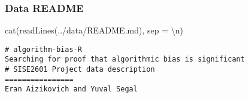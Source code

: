 \documentclass[
]{article}
\newenvironment{Shaded}{\begin{snugshade}}{\end{snugshade}}
\newcommand{\AttributeTok}[1]{\textcolor[rgb]{0.77,0.63,0.00}{#1}}
\newcommand{\FunctionTok}[1]{\textcolor[rgb]{0.00,0.00,0.00}{#1}}
\newcommand{\NormalTok}[1]{#1}
\newcommand{\SpecialCharTok}[1]{\textcolor[rgb]{0.00,0.00,0.00}{#1}}
\newcommand{\StringTok}[1]{\textcolor[rgb]{0.31,0.60,0.02}{#1}}
\begin{document}
\hypertarget{data-readme}{%
\subsubsection{Data README}\label{data-readme}}

\begin{Shaded}
\begin{Highlighting}[]
\FunctionTok{cat}\NormalTok{(}\FunctionTok{readLines}\NormalTok{(}\StringTok{\textquotesingle{}../data/README.md\textquotesingle{}}\NormalTok{), }\AttributeTok{sep =} \StringTok{\textquotesingle{}}\SpecialCharTok{\textbackslash{}n}\StringTok{\textquotesingle{}}\NormalTok{)}
\end{Highlighting}
\end{Shaded}

\begin{verbatim}
# algorithm-bias-R
Searching for proof that algorithmic bias is significant 
# SISE2601 Project data description
================
Eran Aizikovich and Yuval Segal


\end{verbatim}
\end{document}
